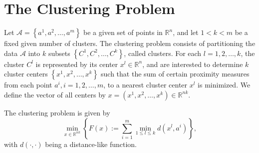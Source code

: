 \documentclass[11pt]{article}
\numberwithin{equation}{section}
\begin{document}
%
%
%
%
%
%
%
%
%
%
%
%
%
%
%
%
%
%
%
%
%

\newpage

\section{The Clustering Problem}

Let $\mathcal{A}= \left\lbrace a^1, a^2, \ldots ,a^m \right\rbrace$ be a given set of points in $\mathbb{R}^n$, and let $1 < k < m$ be a fixed given number of clusters. The clustering problem consists of partitioning the data $\mathcal{A}$ into $k$ subsets $\left\lbrace C^1, C^2, \ldots ,C^k \right\rbrace$, called clusters. For each $l=1, 2, \ldots ,k$, the cluster $C^l$ is represented by its center $x^l \in \mathbb{R}^n$, and are interested to determine $k$ cluster centers $\left\lbrace x^1, x^2, \ldots ,x^k \right\rbrace$ such that the sum of certain proximity measures from each point $a^i, i=1, 2, \ldots ,m$, to a nearest cluster center $x^l$ is minimized. We define the vector of all centers by  $x = (x^1, x^2, \ldots , x^k) \in \mathbb{R}^{nk}$.

The clustering problem is given by
\begin{equation}
	\min\limits_{x \in \mathbb{R}^{nk}} \left\lbrace F(x) := \sum\limits_{i=1}^{m} \min\limits_{1 \le l \le k} d(x^l,a^i) \right\rbrace , \label{StateEq1}
\end{equation}
\noindent with $\textit{d}(\cdot ,\cdot)$ being a distance-like function.
\end{document}
